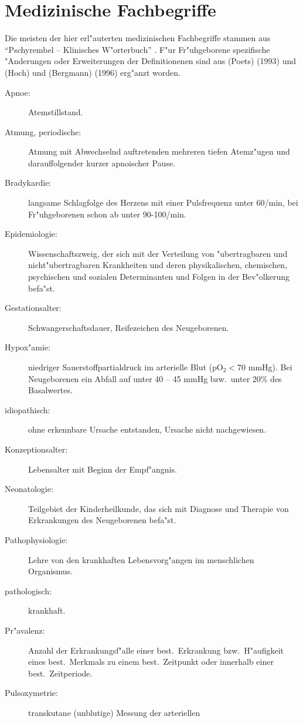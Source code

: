 \chapter{Medizinische Fachbegriffe} 

Die meisten der hier erl"auterten medizinischen Fachbegriffe stammen aus ``Pschyrembel --
Klinisches W"orterbuch'' \cite{Pschyrembel}.  F"ur Fr"uhgeborene spezifische "Anderungen
oder Erweiterungen der Definitionenen sind aus \autor(Poets) (1993) \cite{Poets93} und
\autor(Hoch) und \autor(Bergmann) (1996) \cite{Hoch96} erg"anzt worden.

\begin{description}
\item[Apnoe:] Atemstillstand.
\item[Atmung, periodische:] Atmung mit Abwechselnd auftretenden mehreren tiefen Atemz"ugen
  und darauffolgender kurzer apnoischer Pause.
\item[Bradykardie:] langsame Schlagfolge des Herzens mit einer Pulsfrequenz unter 60/min,
  bei Fr"uhgeborenen schon ab unter 90-100/min.
\item[Epidemiologie:] Wissenschaftszweig, der sich mit der Verteilung von "ubertragbaren
  und nicht"ubertragbaren Krankheiten und deren physikalischen, chemischen, psychischen
  und sozialen Determinanten und Folgen in der Bev"olkerung befa"st.
\item[Gestationsalter:] Schwangerschaftsdauer, Reifezeichen des Neugeborenen.
\item[Hypox"amie:] niedriger Sauerstoffpartialdruck im arterielle Blut ($\mathrm{pO_2}<70$
  mmHg). Bei Neugeborenen ein Abfall auf unter 40 -- 45 mmHg bzw.\  unter 20\% des Basalwertes. 
\item[idiopathisch:] ohne erkennbare Ursache entstanden, Ursache nicht nachgewiesen.
\item[Konzeptionsalter:] Lebensalter mit Beginn der Empf"angnis.
\item[Neonatologie:] Teilgebiet der Kinderheilkunde, das sich mit Diagnose und Therapie von
  Erkrankungen des Neugeborenen befa"st.
\item[Pathophysiologie:] Lehre von den krankhaften Lebensvorg"angen im menschlichen
  Organismus.
\item[pathologisch:] krankhaft.
\item[Pr"avalenz:] Anzahl der Erkrankungsf"alle einer best.\  Erkrankung bzw.\
  H"aufigkeit eines best.\  Merkmals zu einem best.\  Zeitpunkt oder innerhalb einer
  best.\  Zeitperiode.
\item[Pulsoxymetrie:] transkutane (unblutige) Messung der arteriellen

\end{description}
